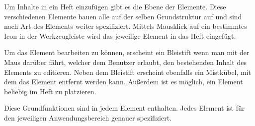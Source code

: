\cfoot{}
Um Inhalte in ein Heft einzufügen gibt es die Ebene der Elemente. Diese verschiedenen Elemente bauen alle auf der selben Grundstruktur auf und sind nach Art des Elements weiter spezifiziert.
Mittels Mausklick auf ein bestimmtes Icon in der Werkzeugleiste wird das jeweilige Element in das Heft eingefügt.

Um das Element bearbeiten zu können, erscheint ein Bleistift wenn man mit der Maus darüber fährt, welcher dem Benutzer erlaubt, den bestehenden Inhalt des Elements zu editieren. Neben dem Bleistift erscheint ebenfalls ein Mistkübel, mit dem das Element entfernt werden kann.
Außerdem ist es möglich, ein Element beliebig im Heft zu platzieren. 

Diese Grundfunktionen sind in jedem Element enthalten. Jedes Element ist für den jeweiligen Anwendungsbereich genauer spezifiziert.